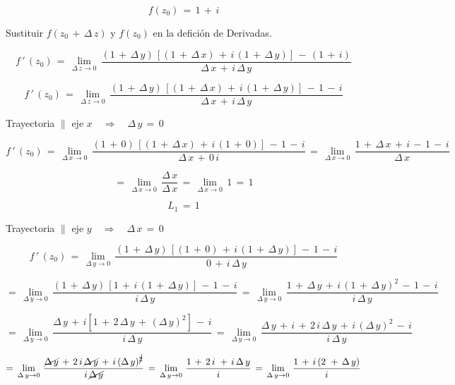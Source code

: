 \documentclass[a4paper,11pt,openany]{book}
\begin{document}
$$f(z_{0})\,=\,1\,+\,i$$

\textcolor{ao(english)}{} Sustituir  $f(z_{0}\,+\,\Delta\,z)$ y $f(z_{0})$ en la defición de Derivadas.

$$f\,'\,(z_{0})\,=\,\displaystyle\lim_{\Delta\,z \to 0}\,\dfrac{(1\,+\,\Delta\,y)\,\left[(1\,+\,\Delta\,x)\,+\,i\,(1\,+\,\Delta\,y)\right]\,-\,(1\,+\,i)}{\Delta\,x\,+\,i\,\Delta\,y}$$

$$f\,'\,(z_{0})\,=\,\displaystyle\lim_{\Delta\,z \to 0}\,\dfrac{(1\,+\,\Delta\,y)\,\left[(1\,+\,\Delta\,x)\,+\,i\,(1\,+\,\Delta\,y)\right]\,-\,1\,-\,i}{\Delta\,x\,+\,i\,\Delta\,y}$$

\textcolor{ao(english)}{} Trayectoria $\parallel$ eje $x \quad\Rightarrow\quad \Delta\,y\,=\,0$

$$f\,'\,(z_{0})\,=\,\displaystyle\lim_{\Delta\,x \to 0}\,\dfrac{(1\,+\,0)\,\left[(1\,+\,\Delta\,x)\,+\,i\,(1\,+\,0)\right]\,-\,1\,-\,i}{\Delta\,x\,+\,0\,i}\,=\,\displaystyle\lim_{\Delta\,x \to 0}\,\dfrac{1\,+\,\Delta\,x\,+\,i\,-\,1\,-\,i}{\Delta\,x}$$

$$=\,\displaystyle\lim_{\Delta\,x \to 0}\,\dfrac{\Delta\,x}{\Delta\,x}\,=\,\displaystyle\lim_{\Delta\,x \to 0}\,1\,=\,1$$

$$L_{1}\,=\,1$$

\textcolor{ao(english)}{} Trayectoria $\parallel$ eje $y \quad\Rightarrow\quad \Delta\,x\,=\,0$

$$f\,'\,(z_{0})\,=\,\displaystyle\lim_{\Delta\,y \to 0}\,\dfrac{(1\,+\,\Delta\,y)\,\left[(1\,+\,0)\,+\,i\,(1\,+\,\Delta\,y)\right]\,-\,1\,-\,i}{0\,+\,i\,\Delta\,y}$$

$$=\,\displaystyle\lim_{\Delta\,y \to 0}\,\dfrac{(1\,+\,\Delta\,y)\,\left[1\,+\,i\,(1\,+\,\Delta\,y)\right]\,-\,1\,-\,i}{i\,\Delta\,y}\,=\,\displaystyle\lim_{\Delta\,y \to 0}\,\dfrac{1\,+\,\Delta\,y\,+\,i\,(1\,+\,\Delta\,y)^{2}\,-\,1\,-\,i}{i\,\Delta\,y}$$

$$=\,\displaystyle\lim_{\Delta\,y \to 0}\,\dfrac{\Delta\,y\,+\,i[1\,+\,2\,\Delta\,y\,+\,(\Delta\,y)^{2}]\,-\,i}{i\,\Delta\,y}\,=\,\displaystyle\lim_{\Delta\,y \to 0}\,\dfrac{\Delta\,y\,+\,i\,+\,2\,i\,\Delta\,y\,+\,i\,(\Delta\,y)^{2}\,-\,i}{i\,\Delta\,y}$$

$$=\,\displaystyle\lim_{\Delta\,y \to 0}\,\dfrac{\cancel{\Delta\,y}\,+\,2\,i\,\cancel{\Delta\,y}\,+\,i\,(\Delta\,y)^{\cancel{2}}}{i\,\cancel{\Delta\,y}}\,=\,\displaystyle\lim_{\Delta\,y \to 0}\,\dfrac{1\,+\,2\,i\,\,+\,i\,\Delta\,y}{i}\,=\,\displaystyle\lim_{\Delta\,y \to 0}\,\dfrac{1\,+\,i\,(2\,\,+\,\Delta\,y)}{i}$$
\end{document}
